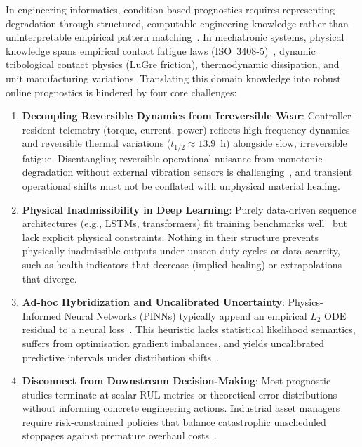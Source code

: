 \documentclass[a4paper,fleqn]{cas-dc}
\begin{document}
In engineering informatics, condition-based prognostics requires representing degradation through structured, computable engineering knowledge rather than uninterpretable empirical pattern matching~\cite{Liao_2023, D_He_2025, vonRueden_2023}. In mechatronic systems, physical knowledge spans empirical contact fatigue laws (ISO~3408-5)~\cite{ISO_3408_5}, dynamic tribological contact physics (LuGre friction), thermodynamic dissipation, and unit manufacturing variations. Translating this domain knowledge into robust online prognostics is hindered by four core challenges:
\begin{enumerate}[label=(\roman*),leftmargin=2.2em]
    \item \textbf{Decoupling Reversible Dynamics from Irreversible Wear}: Controller-resident telemetry (torque, current, power) reflects high-frequency dynamics and reversible thermal variations ($t_{1/2} \approx 13.9$~h) alongside slow, irreversible fatigue. Disentangling reversible operational nuisance from monotonic degradation without external vibration sensors is challenging~\cite{Pandhare_2021}, and transient operational shifts must not be conflated with unphysical material healing.
    \item \textbf{Physical Inadmissibility in Deep Learning}: Purely data-driven sequence architectures (e.g., LSTMs, transformers) fit training benchmarks well~\cite{Wang_2022, Wei_2024} but lack explicit physical constraints. Nothing in their structure prevents physically inadmissible outputs under unseen duty cycles or data scarcity, such as health indicators that decrease (implied healing) or extrapolations that diverge.
    \item \textbf{Ad-hoc Hybridization and Uncalibrated Uncertainty}: Physics-Informed Neural Networks (PINNs) typically append an empirical $L_2$ ODE residual to a neural loss~\cite{Yan_2026, Gao_2024, Xu_2023, P_Zhang_2026}. This heuristic lacks statistical likelihood semantics, suffers from optimisation gradient imbalances, and yields uncalibrated predictive intervals under distribution shifts~\cite{Xu_2023, Lai_2024, Zhang_CP_2025}.
    \item \textbf{Disconnect from Downstream Decision-Making}: Most prognostic studies terminate at scalar RUL metrics or theoretical error distributions without informing concrete engineering actions. Industrial asset managers require risk-constrained policies that balance catastrophic unscheduled stoppages against premature overhaul costs~\cite{Aivaliotis_2021, D_He_2025}.
\end{enumerate}
\end{document}
